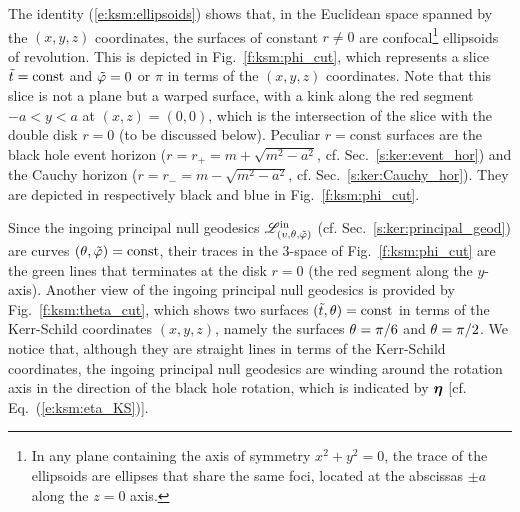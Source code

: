 The identity (\ref{e:ksm:ellipsoids}) shows that, in the Euclidean space spanned by the $(x,y,z)$ coordinates,
the surfaces of constant $r\not=0$ are
confocal\footnote{In any plane containing the axis of symmetry $x^2+y^2=0$, the trace of
the ellipsoids are ellipses that share the same foci, located
at the abscissas $\pm a$ along the $z=0$ axis.}
ellipsoids of revolution.
This is depicted in Fig.~\ref{f:ksm:phi_cut}, which represents
a slice ${\tilde t}=\mathrm{const}$ and ${\tilde\varphi} = 0$ or $\pi$ in terms of
the $(x,y,z)$ coordinates. Note that this slice is not a plane but a warped surface,
with a kink along the red segment $-a<y<a$ at $(x,z) = (0,0)$, which is the intersection
of the slice with the double disk $r=0$ (to be discussed below).
Peculiar $r=\mathrm{const}$ surfaces are
the black hole event horizon ($r=r_+=m + \sqrt{m^2 - a^2}$, cf. Sec.~\ref{s:ker:event_hor}) and the Cauchy horizon
($r = r_- = m - \sqrt{m^2 - a^2}$, cf. Sec.~\ref{s:ker:Cauchy_hor}).
They are depicted in respectively black and blue in Fig.~\ref{f:ksm:phi_cut}.

Since the ingoing principal null geodesics $\mathscr{L}^{\rm in}_{(v,\theta,{\tilde\varphi})}$
(cf. Sec.~\ref{s:ker:principal_geod}) are curves $(\theta, {\tilde\varphi}) = \mathrm{const}$,
their traces in the
3-space of Fig.~\ref{f:ksm:phi_cut} are the green lines that terminates
at the disk $r=0$ (the red segment along the $y$-axis).
Another view of the ingoing principal null geodesics is provided by
Fig.~\ref{f:ksm:theta_cut}, which shows two surfaces $({\tilde t},\theta)=\mathrm{const}$
in terms of the Kerr-Schild coordinates $(x,y,z)$, namely the surfaces
$\theta = \pi/6$ and $\theta = \pi/2$. We notice that, although they are
straight lines in terms of the Kerr-Schild coordinates, the ingoing principal null geodesics are winding around the rotation axis in the direction of the black hole rotation,
which is indicated by $\bm{\eta}$ [cf. Eq.~(\ref{e:ksm:eta_KS})].

